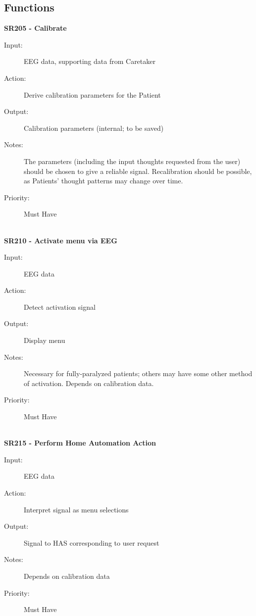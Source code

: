 \documentclass{article}
\begin{document}
\subsection{Functions}


\textbf{SR205 - Calibrate}
\begin{description}
    \item[Input:] EEG data, supporting data from Caretaker
    \item[Action:] Derive calibration parameters for the Patient
    \item[Output:] Calibration parameters (internal; to be saved)
    \item[Notes:] The parameters (including the input thoughts requested from
        the user) should be chosen to give a reliable signal. Recalibration
        should be possible, as Patients' thought patterns may change over
        time.
    \item[Priority:] Must Have
\end{description}

\hfill \\

\textbf{SR210 - Activate menu via EEG}
\begin{description}
    \item[Input:] EEG data
    \item[Action:] Detect activation signal
    \item[Output:] Display menu
    \item[Notes:] Necessary for fully-paralyzed patients; others may have some
        other method of activation. Depends on calibration data.
    \item[Priority:] Must Have
\end{description}

\hfill \\

\textbf{SR215 - Perform Home Automation Action}
\begin{description}
    \item[Input:] EEG data
    \item[Action:] Interpret signal as menu selections
    \item[Output:] Signal to HAS corresponding to user request
    \item[Notes:] Depends on calibration data
    \item[Priority:] Must Have
\end{description}
\end{document}
